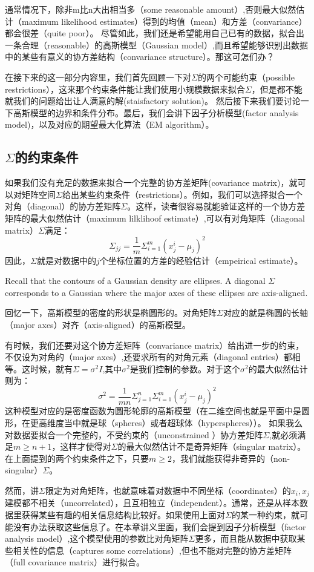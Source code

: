 \documentclass[14pt,a4paper]{article}
\begin{document}
\begin{spacing}{1.5}
通常情况下，除非m比n大出相当多（some reasonable amount）,否则最大似然估计（maximum likelihood estimates）得到的均值（mean）和方差（convariance）都会很差（quite poor）。 尽管如此，我们还是希望能用自己已有的数据，拟合出一条合理（reasonable）的高斯模型（Gaussian model）,而且希望能够识别出数据中的某些有意义的协方差结构（convariance structure）。那这可怎们办？

在接下来的这一部分内容里，我们首先回顾一下对$\Sigma$的两个可能约束（possible restrictions），这来那个约束条件能让我们使用小规模数据来拟合$\Sigma$，但是都不能就我们的问题给出让人满意的解(staisfactory solution)。 然后接下来我们要讨论一下高斯模型的边界和条件分布。最后，我们会讲下因子分析模型(factor analysis model)，以及对应的期望最大化算法（EM algorithm）。
\end{spacing}
\subsection {$\Sigma$的约束条件} 
\begin{spacing}{1.5}
\quad \quad 如果我们没有充足的数据来拟合一个完整的协方差矩阵(covariance matrix)，就可以对矩阵空间$\Sigma$给出某些约束条件（restrictions）。例如，我们可以选择拟合一个对角（diagonal）的协方差矩阵$\Sigma$。这样，读者很容易就能验证这样的一个协方差矩阵的最大似然估计（maximum lilklihoof estimate）,可以有对角矩阵（diagonal matrix）$\Sigma$满足：
$$
\Sigma_{jj}=\frac{1}{m}\Sigma_{i=1}^{m}(x_{j}^{i}-\mu_{j})^2
$$
因此，$\Sigma$就是对数据中的$j$个坐标位置的方差的经验估计（empeirical estimate）。

Recall that the contours of a Gaussian density are ellipses. A diagonal $\Sigma$ corresponds to a Gaussian where the major axes of these ellipses are axis-aligned.

回忆一下，高斯模型的密度的形状是椭圆形的。对角矩阵$\Sigma$对应的就是椭圆的长轴（major axes）对齐（axis-aligned）的高斯模型。

有时候，我们还要对这个协方差矩阵（convariance matrix）给出进一步的约束，不仅设为对角的（major axes）,还要求所有的对角元素（diagonal entries）都相等。这时候，就有$\Sigma=\sigma^2I$,其中$\sigma^2$是我们控制的参数。对于这个$\sigma^2$的最大似然估计则为：
$$
\sigma^2=\frac{1}{mn}\Sigma_{j=1}^{n}\Sigma_{i=1}^{m}(x_{j}^{i}-\mu_{j})^2
$$
这种模型对应的是密度函数为圆形轮廓的高斯模型（在二维空间也就是平面中是圆形，在更高维度当中就是球（spheres）或者超球体（hyperspheres））。
如果我么对数据要拟合一个完整的，不受约束的（unconstrained ）协方差矩阵$\Sigma$,就必须满足$m\geq n+1$，这样才使得对$\Sigma$的最大似然估计不是奇异矩阵（singular matrix）。在上面提到的两个约束条件之下，只要$m\geq 2$，我们就能获得非奇异的（non-singular）$\Sigma$。

然而，讲$\Sigma$限定为对角矩阵，也就意味着对数据中不同坐标（coordinates）的$x_{i},x_{j}$建模都不相关（uncorrelated），且互相独立（independent）。通常，还是从样本数据里获得某些有趣的相关信息结构比较好。如果使用上面对$\Sigma$的某一种约束，就可能没有办法获取这些信息了。在本章讲义里面，我们会提到因子分析模型（factor analysis model）,这个模型使用的参数比对角矩阵$\Sigma$更多，而且能从数据中获取某些相关性的信息（captures some correlations）,但也不能对完整的协方差矩阵（full covariance matrix）进行拟合。
\end{spacing}
\end{document}
